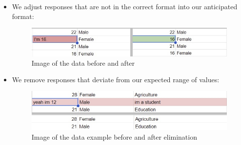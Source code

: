\begin{itemize}
                    \item We adjust responses that are not in the correct format into our anticipated format:
                        \begin{figure}[H]
                            \centering
                            \includegraphics[scale=0.5]{graphics/data/Wrongformat3.jpg}
                            \caption{Image of the data before and after}
                        \end{figure}
                        
                    \item We remove responses that deviate from our expected range of values:
                        \begin{figure}[H]
                            \centering
                            \includegraphics[scale=0.6]{graphics/data/eliminate3.jpg}
                            \caption{Image of the data example before and after elimination}
                        \end{figure} 


\end{itemize}

